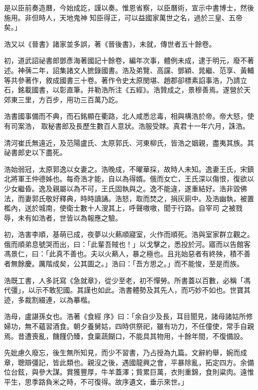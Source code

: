 \begin{pinyinscope}
 是以臣前奏造曆，今始成訖，謹以奏。惟恩省察，以臣曆術，宣示中書博士，然後施用。非但時人，天地鬼神
 知臣得正，可以益國家萬世之名，過於三皇、五帝矣。」



 浩又以《晉書》諸家並多誤，著《晉後書》，未就，傳世者五十餘卷。



 初，道武詔祕書郎鄧彥海著國記十餘卷，編年次事，體例未成，逮于明元，廢不著述。神蒨二年，詔集諸文人摭錄國書。浩及弟覽、高讜、鄧穎、晁繼、范享、黃輔等共參著作，敘成國書三十卷。著作令史太原閔堪、趙郡卻標素諂事浩，乃請立石，銘載國書，以彰直筆。并勒浩所注《五經》。浩贊成之，景穆善焉。遂營於天郊東三里，方百步，用功三百萬乃訖。



 浩書國事備而不典，而石銘顯在衢路，北人咸悉忿毒，相與構浩於帝。帝大怒，使有司案浩，
 取秘書郎及長歷生數百人意狀。浩服受賕。真君十一年六月，誅浩。



 清河崔氏無遠近，及范陽盧氏、太原郭氏、河東柳氏，皆浩之姻親，盡夷其族。其祕書郎史以下盡死。



 浩始弱冠，太原郭逸以女妻之。浩晚成，不曜華採，故時人未知。逸妻王氏，宋鎮北將軍王仲德姊也。每奇浩才能，自以為得婿。俄而女亡，王氏深以傷恨，復欲以少女繼昏。逸及親屬以為不可，王氏固執與之。逸不能違，遂重結好。浩非毀佛法，而妻郭氏敬好釋典，時時讀誦。浩怒，取而焚之，捐灰廁中。及浩幽執，被置檻內，送於城南，使衛士數十人溲其上，呼聲嗷嗷，聞于行路。自宰司
 之被戮辱，未有如浩者，世皆以為報應之驗。



 初，浩害李順，基萌已成，夜夢以火爇順寢室，火作而順死。浩與室家群立觀之。俄而順弟息號哭而出，曰：「此輩吾賊也！」以戈擊之，悉投於河。寤而以告館客馮景仁，曰：「此真不善也。夫以火爇人，暴之極也。且兆始惡者有終殃，積不善者無餘慶。厲階成矣，公其圖之。」浩曰：「吾方思之。」而不能悛，至是而族。



 浩既工書，人多託寫《急就章》，從少至老，初不憚勞。所書蓋以百數，必稱「馮代彊」，以示不敢犯國。其謹也如此。浩書體勢及其先人，而巧妙不如也。世寶其迹，多裁割綴連，以為摹楷。



 浩母，盧諶孫女也。浩著《食經
 序》曰：「余自少及長，耳目聞見，諸母諸姑所修婦功，無不蘊習酒食。朝夕養舅姑，四時供祭祀，雖有功力，不任僮使，常手自親焉。昔遭喪亂，饑饉仍臻，食稟蔬餬口，不能具其物用，十餘年間，不復備設。



 先妣慮久廢忘，後生無所知見，而少不習書，乃占授為九篇。文辭約舉，婉而成章，聰辯彊記，皆此類也。親沒之後，遇國龍興之會，平暴除亂，拓定四方。余備位台鉉，與參大謀。賞獲豐厚，牛羊蓋澤；貲累巨萬，衣則重錦，食則粱肉。遠惟平生，思季路負米之時，不可復得。故序遺文，垂示來世。」




\end{pinyinscope}
